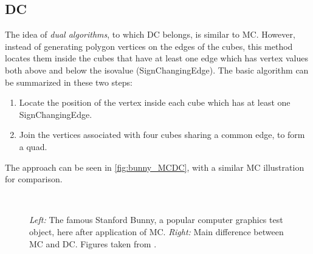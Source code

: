 \subsection{\Acl{DC}}
\label{ssec:DC}
The idea of \emph{dual algorithms}, to which \acf{DC} belongs, is similar to \ac{MC}. However, instead of generating polygon vertices on the edges of the cubes, this method locates them inside the cubes that have at least one edge which has vertex values both above and below the isovalue (\acs{SignChangingEdge}). The basic algorithm can be summarized in these two steps:
\begin{enumerate}
\item Locate the position of the vertex inside each cube which has at least one \ac{SignChangingEdge}.
\item Join the vertices associated with four cubes sharing a common edge, to form a \ac{quad}.
\end{enumerate}
The approach can be seen in \autoref{fig:bunny_MCDC}, with a similar \ac{MC} illustration for comparison.

\begin{figure}
\centering
   \\
   \caption{\textit{Left:} The famous Stanford Bunny, a popular computer graphics test object, here after application of \ac{MC}. \textit{Right:} Main difference between \ac{MC} and \ac{DC}.  Figures taken from \cite{Hermite2002}. }
   \label{fig:bunny_MCDC}
\end{figure}


